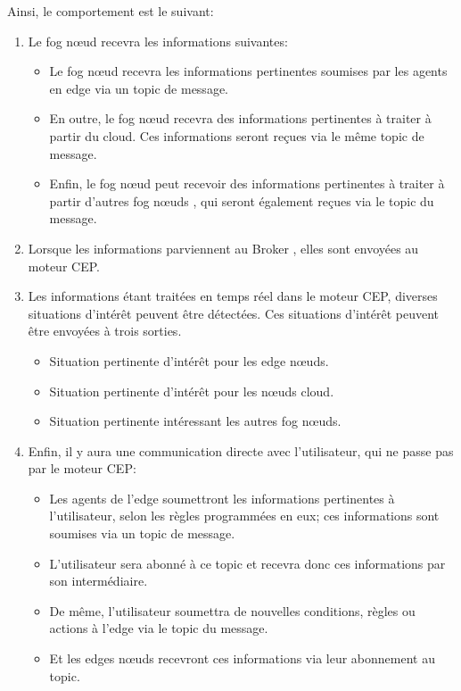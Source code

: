 Ainsi, le comportement est le suivant:
\begin{enumerate}
    \item Le fog nœud recevra les informations suivantes:
    \begin{itemize}
        \item Le fog nœud recevra les informations pertinentes soumises par les agents en edge via un topic de message.
 \item  En outre, le fog nœud recevra des informations pertinentes à traiter à partir du cloud. Ces informations seront reçues via le même topic de message.
 \item  Enfin, le fog nœud peut recevoir des informations pertinentes à traiter à partir d'autres fog nœuds , qui seront également reçues via le topic du message.

    \end{itemize}
    \item Lorsque les informations parviennent au Broker , elles sont envoyées au moteur CEP.
    \item Les informations étant traitées en temps réel dans le moteur CEP, diverses situations d'intérêt peuvent être détectées. Ces situations d'intérêt peuvent être envoyées à trois sorties.
    \begin{itemize}
        \item Situation pertinente d'intérêt pour les edge nœuds.
        \item Situation pertinente d'intérêt pour les nœuds cloud.
        \item Situation pertinente intéressant les autres fog nœuds.
    \end{itemize}
    \item Enfin, il y aura une communication directe avec l'utilisateur, qui ne passe pas par le moteur CEP:
    \begin{itemize}
        \item Les agents de l'edge soumettront les informations pertinentes à l'utilisateur, selon les règles programmées en eux; ces informations sont soumises via un topic de message.
\item L'utilisateur sera abonné à ce topic et recevra donc ces informations par son intermédiaire.
\item De même, l'utilisateur soumettra de nouvelles conditions, règles ou actions à l'edge via le topic du message.
\item Et les edges nœuds recevront ces informations via leur abonnement au topic.

    \end{itemize}
\end{enumerate}

